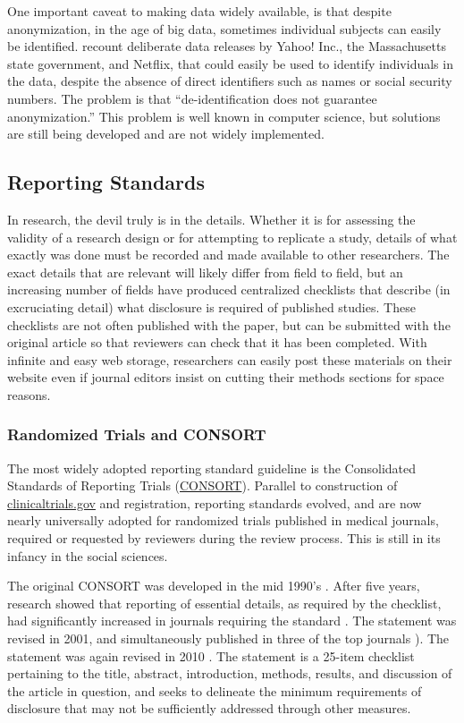 \documentclass[12pt] {article}
\begin{document}
One important caveat to making data widely available, is that despite
anonymization, in the age of big data, sometimes individual subjects can
easily be identified. \cite{heffetz_privacy_2014} recount deliberate data
releases by Yahoo! Inc., the Massachusetts state government, and
Netflix, that could easily be used to identify individuals in the data,
despite the absence of direct identifiers such as names or social
security numbers. The problem is that ``de-identification does not
guarantee anonymization.'' This problem is well known in computer science, but solutions are still being developed and are not widely implemented.


\subsection{Reporting Standards}\label{reporting-standards}
In research, the devil truly is in the details. Whether it is for assessing the validity of a research design or for
attempting to replicate a study, details of what exactly was done must be recorded and made available to other researchers.
The exact details that are relevant will likely differ from field to field, but an increasing number of fields have
produced centralized checklists that describe (in excruciating detail) what disclosure is required of published studies. These checklists are not often published with the paper, but can be submitted with the original article so that reviewers can check that it has been completed. With infinite and easy web storage, researchers can easily post these materials on their website even if journal editors insist on cutting their methods sections for space reasons. 

\subsubsection{Randomized Trials and CONSORT}\label{randomized-trials}
The most widely adopted reporting standard guideline is the Consolidated Standards of Reporting Trials (\href{http://www.consort-statement.org}{CONSORT}). Parallel to construction of \href{http://clinicaltrials.gov}{clinicaltrials.gov} and registration,
reporting standards evolved, and are now nearly universally adopted for randomized trials published in medical journals, required or requested by reviewers during the review process. This is still in its infancy in the social sciences.

The original CONSORT  was developed in the mid 1990's \citep{begg_c_improving_1996}. After five years, research showed that reporting of essential details, as required by the checklist, had significantly increased in journals requiring the standard  \citep{moher_d_use_2001}. The statement was revised in 2001, and simultaneously published in three of the top journals \citep{moher_consort_2001}). The statement was again revised in 2010 \citep{schulz_consort_2010}. The statement is a 25-item checklist pertaining to the title, abstract, introduction, methods, results, and discussion of the article in question, and seeks to delineate the minimum requirements of disclosure that may not be sufficiently addressed through other measures.
\end{document}
